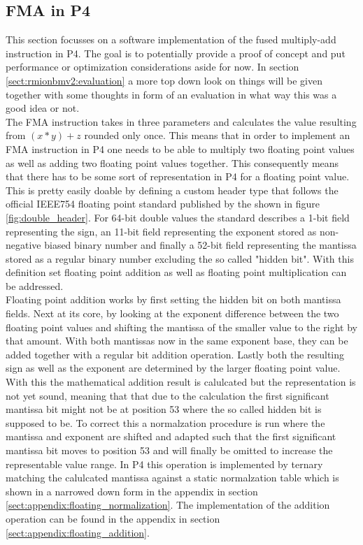 \subsection{FMA in P4}
\label{sect:rmionbmv2:fma}
This section focusses on a software implementation of the fused multiply-add instruction in P4. The goal is to potentially provide a proof of concept and put performance or optimization considerations aside for now. In section \ref{sect:rmionbmv2:evaluation} a more top down look on things will be given together with some thoughts in form of an evaluation in what way this was a good idea or not.\\

The FMA instruction takes in three parameters and calculates the value resulting from \((x * y) + z\) rounded only once. This means that in order to implement an FMA instruction in P4 one needs to be able to multiply two floating point values as well as adding two floating point values together. This consequently means that there has to be some sort of representation in P4 for a floating point value. This is pretty easily doable by defining a custom header type that follows the official IEEE754 floating point standard published by the \cite{ieee754} shown in figure \ref{fig:double_header}. For 64-bit double values the standard describes a 1-bit field representing the sign, an 11-bit field representing the exponent stored as non-negative biased binary number and finally a 52-bit field representing the mantissa stored as a regular binary number excluding the so called "hidden bit". With this definition set floating point addition as well as floating point multiplication can be addressed.\\

Floating point addition works by first setting the hidden bit on both mantissa fields. Next at its core, by looking at the exponent difference between the two floating point values and shifting the mantissa of the smaller value to the right by that amount. With both mantissas now in the same exponent base, they can be added together with a regular bit addition operation. Lastly both the resulting sign as well as the exponent are determined by the larger floating point value. With this the mathematical addition result is calulcated but the representation is not yet sound, meaning that that due to the calculation the first significant mantissa bit might not be at position 53 where the so called hidden bit is supposed to be. To correct this a normalzation procedure is run where the mantissa and exponent are shifted and adapted such that the first significant mantissa bit moves to position 53 and will finally be omitted to increase the representable value range. In P4 this operation is implemented by ternary matching the calulcated mantissa against a static normalzation table which is shown in a narrowed down form in the appendix in section \ref{sect:appendix:floating_normalization}. The implementation of the addition operation can be found in the appendix in section \ref{sect:appendix:floating_addition}.\\

